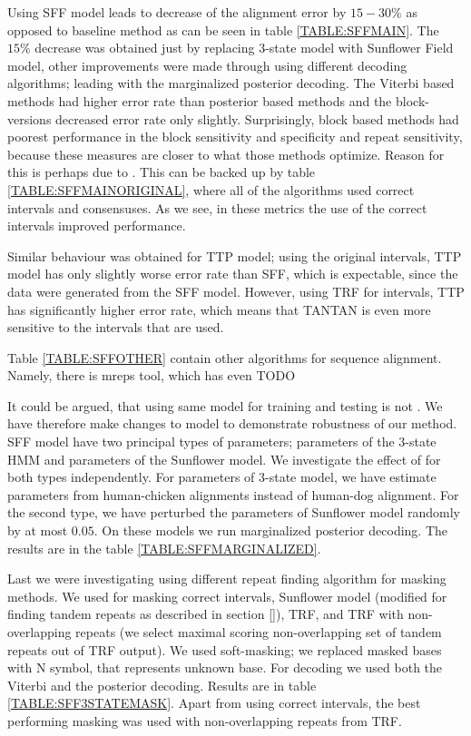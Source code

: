 Using SFF model leads to decrease of the alignment error by $15-30\%$ as
opposed to baseline method as can be seen in table \ref{TABLE:SFFMAIN}. The
$15\%$ decrease was obtained just by replacing 3-state model with Sunflower
Field model, other improvements were made through using different decoding
algorithms; leading with the marginalized posterior decoding. The Viterbi based
methods had higher error rate than posterior based methods and the
block-versions decreased error rate only slightly. Surprisingly, block based
methods had poorest performance in the block sensitivity and specificity and
repeat sensitivity, because these measures are closer to what those methods
optimize. Reason for this is perhaps due to . This can be backed up by table \ref{TABLE:SFFMAINORIGINAL}, where
all of the algorithms used correct intervals and consensuses. As we see, in
these metrics the use of the correct intervals improved performance.

Similar behaviour was obtained for TTP model; using the original intervals, TTP
model has only slightly worse error rate than SFF, which is expectable, since
the data were generated from the SFF model. However, using TRF for intervals,
TTP has significantly higher error rate, which means that TANTAN is even more
sensitive to the intervals that are used. 

Table \ref{TABLE:SFFOTHER} contain other algorithms for sequence alignment. Namely, 
there is mreps tool\cite{}, which has even  TODO

It could be argued, that using same model for training and testing is not
. We have therefore make changes to model to demonstrate
robustness of our method. SFF model have two principal types of parameters;
parameters of the 3-state HMM and parameters of the Sunflower model. We
investigate the effect of  for both types
independently. For parameters of 3-state model, we have estimate parameters
from human-chicken alignments instead of human-dog alignment. For the second
type, we have perturbed the parameters of Sunflower model randomly by at most
$0.05$. On these models we run marginalized posterior decoding. The results are
in the table \ref{TABLE:SFFMARGINALIZED}.

Last we were investigating using different repeat finding
algorithm for masking methods. We used for masking correct intervals, Sunflower
model (modified for finding tandem repeats as described in section \ref{}),
TRF, and TRF with non-overlapping repeats (we select maximal scoring
non-overlapping set of tandem repeats out of TRF output). We used soft-masking;
we replaced masked bases with N symbol, that represents unknown base. For
decoding we used both the Viterbi and the posterior decoding. Results are in
table \ref{TABLE:SFF3STATEMASK}. Apart from  using correct intervals, the best
performing masking was used with non-overlapping repeats from TRF.

